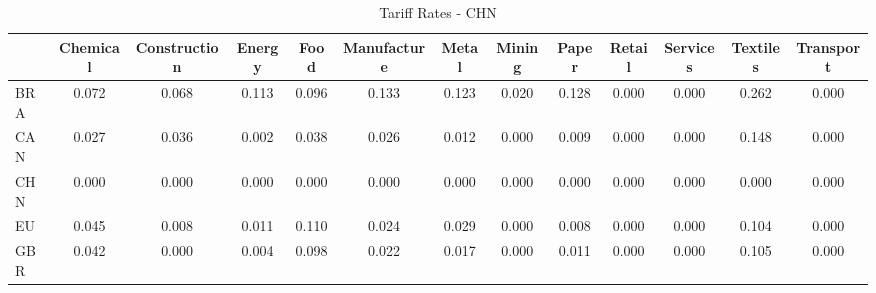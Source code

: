 \begin{table}[htbp]
\centering
\caption{Tariff Rates - CHN} 
\label{tab:tariff_CHN}
\begin{tabular}{lcccccccccccc}
  \hline
 & Chemical & Construction & Energy & Food & Manufacture & Metal & Mining & Paper & Retail & Services & Textiles & Transport \\ 
  \hline
BRA & \textcolor[RGB]{59,38,196}{0.072} & \textcolor[RGB]{66,43,189}{0.068} & \textcolor[RGB]{28,18,227}{0.113} & \textcolor[RGB]{42,27,212}{0.096} & \textcolor[RGB]{17,11,238}{0.133} & \textcolor[RGB]{25,16,230}{0.123} & \textcolor[RGB]{117,76,138}{0.020} & \textcolor[RGB]{21,14,234}{0.128} & \textcolor[RGB]{255,165,0}{0.000} & \textcolor[RGB]{255,165,0}{0.000} & \textcolor[RGB]{2,1,253}{0.262} & \textcolor[RGB]{255,165,0}{0.000} \\ 
  CAN & \textcolor[RGB]{104,67,151}{0.027} & \textcolor[RGB]{91,59,164}{0.036} & \textcolor[RGB]{151,98,104}{0.002} & \textcolor[RGB]{87,56,168}{0.038} & \textcolor[RGB]{106,69,149}{0.026} & \textcolor[RGB]{132,85,123}{0.012} & \textcolor[RGB]{255,165,0}{0.000} & \textcolor[RGB]{138,89,117}{0.009} & \textcolor[RGB]{255,165,0}{0.000} & \textcolor[RGB]{255,165,0}{0.000} & \textcolor[RGB]{13,8,242}{0.148} & \textcolor[RGB]{255,165,0}{0.000} \\ 
  CHN & \textcolor[RGB]{255,165,0}{0.000} & \textcolor[RGB]{255,165,0}{0.000} & \textcolor[RGB]{255,165,0}{0.000} & \textcolor[RGB]{255,165,0}{0.000} & \textcolor[RGB]{255,165,0}{0.000} & \textcolor[RGB]{255,165,0}{0.000} & \textcolor[RGB]{255,165,0}{0.000} & \textcolor[RGB]{255,165,0}{0.000} & \textcolor[RGB]{255,165,0}{0.000} & \textcolor[RGB]{255,165,0}{0.000} & \textcolor[RGB]{255,165,0}{0.000} & \textcolor[RGB]{255,165,0}{0.000} \\ 
  EU & \textcolor[RGB]{79,51,176}{0.045} & \textcolor[RGB]{140,91,115}{0.008} & \textcolor[RGB]{134,87,121}{0.011} & \textcolor[RGB]{30,19,225}{0.110} & \textcolor[RGB]{110,72,144}{0.024} & \textcolor[RGB]{102,66,153}{0.029} & \textcolor[RGB]{255,165,0}{0.000} & \textcolor[RGB]{142,92,113}{0.008} & \textcolor[RGB]{255,165,0}{0.000} & \textcolor[RGB]{255,165,0}{0.000} & \textcolor[RGB]{36,23,219}{0.104} & \textcolor[RGB]{255,165,0}{0.000} \\ 
  GBR & \textcolor[RGB]{83,54,172}{0.042} & \textcolor[RGB]{157,102,98}{0.000} & \textcolor[RGB]{149,96,106}{0.004} & \textcolor[RGB]{40,26,215}{0.098} & \textcolor[RGB]{113,73,142}{0.022} & \textcolor[RGB]{121,78,134}{0.017} & \textcolor[RGB]{255,165,0}{0.000} & \textcolor[RGB]{136,88,119}{0.011} & \textcolor[RGB]{255,165,0}{0.000} & \textcolor[RGB]{255,165,0}{0.000} & \textcolor[RGB]{34,22,221}{0.105} & \textcolor[RGB]{255,165,0}{0.000} \\ 

\end{tabular}
\end{table}
